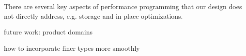There are several key aspects of performance programming that our design
does not directly address, e.g.  storage and in-place optimizations.

future work:
product domains

how to incorporate finer types more smoothly


